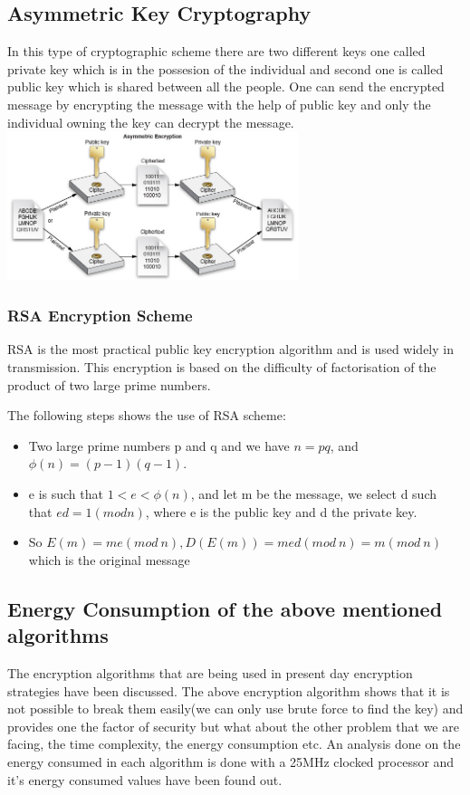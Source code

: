 \documentclass[conference]{IEEEtran}
\begin{document}
\subsection{Asymmetric Key Cryptography}
In this type of cryptographic scheme there are two different keys one called private key which is in the possesion of the individual and second one is called public key which is shared between all the people. One can send the encrypted message by encrypting the message with the help of public key and only the individual owning the key can decrypt the message.
\includegraphics[width=8.5cm]{asymmetric}

\subsubsection{RSA Encryption Scheme}
RSA is the most practical public key encryption algorithm and is used widely in transmission. This encryption is based on the difficulty of factorisation of the product of two large prime numbers.

The following steps shows the use of RSA scheme:
\begin{itemize}
  \item Two large prime numbers p and q and we have \(n = pq \), and \(\phi(n) = (p-1)(q-1)\).
  \item e is such that \(1 < e < \phi(n)\), and let m be the message, we select d such that \(ed = 1 (mod n)\), where e is the public key and d the private key.
  \item So \(E(m) = me  (mod\ n), D(E(m)) = med (mod\ n) = m (mod\ n)\) which is the original message
\end{itemize}

\subsection{Energy Consumption of the above mentioned algorithms}
The encryption algorithms that are being used in present day encryption strategies have been discussed. The above encryption algorithm shows that it is not possible to break them easily(we can only use brute force to find the key) and provides one the factor of security but what about the other problem that we are facing, the time complexity, the energy consumption etc. An analysis done on the energy consumed in each algorithm is done with a 25MHz clocked processor and it's energy consumed values have been found out.
\end{document}
